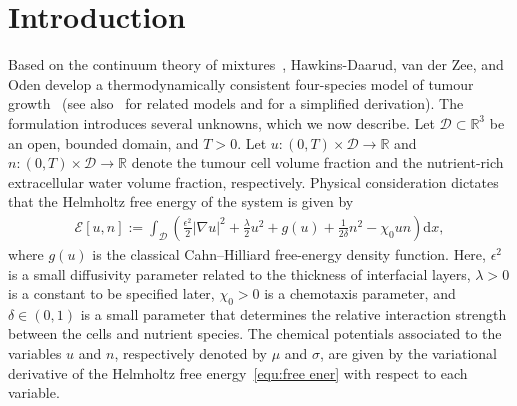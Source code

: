 \documentclass[11pt, reqno]{amsart}
\theoremstyle{definition}
\numberwithin{equation}{section}
\newcommand{\bb}{\mathbb}
\newcommand{\dx}{\mathrm{d}x}
\newcommand{\abs}[1]{\left|{#1}\right|}
\begin{document}
\section{Introduction}

Based on the continuum theory of mixtures~\cite{OdeHawPru10}, Hawkins-Daarud, van der Zee, and Oden develop a thermodynamically consistent four-species model of tumour growth~\cite{HawZeeOde12} (see also~\cite{CriLiLowWis09, Fri23} for related models and \cite{WanLinYan25} for a simplified derivation). The formulation introduces several unknowns, which we now describe. {Let $\mathscr{D}\subset \bb{R}^3$ be an open, bounded domain, and $T>0$. Let $u:(0,T)\times\mathscr{D}\to\bb{R}$ and $n:(0,T)\times\mathscr{D}\to\bb{R}$ denote the tumour cell volume fraction and the nutrient-rich extracellular water volume fraction, respectively.} Physical consideration dictates that the Helmholtz free energy of the system is given by
\begin{align}\label{equ:free ener}
	\mathcal{E}[u,n]:= \int_\mathscr{D} \left( \frac{\epsilon^2}{2} \abs{\nabla u}^2 + \frac{\lambda}{2} u^2 + g(u) + \frac{1}{2\delta} n^2  - \chi_0 un\right) \dx,
\end{align}
where $g(u)$ is the classical Cahn--Hilliard free-energy density function.
Here, $\epsilon^2$ is a small diffusivity parameter related to the thickness of interfacial layers, $\lambda >0$ is a constant to be specified later, $\chi_0>0$ is a chemotaxis parameter, and $\delta\in (0,1)$ is a small parameter that determines the relative interaction strength between the cells and nutrient species.
The chemical potentials associated to the variables $u$ and $n$, respectively denoted by $\mu$ and $\sigma$, are given by the variational derivative of the Helmholtz free energy~\eqref{equ:free ener} with respect to each variable. 
\end{document}
